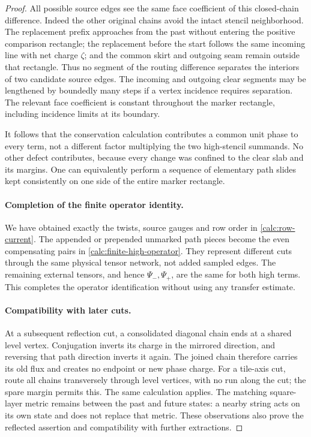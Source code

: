 \begin{proof}
All possible source edges see the same face coefficient of this
closed-chain difference.  Indeed the other original chains avoid
the intact stencil neighborhood.  The replacement prefix approaches
from the past without entering the positive comparison rectangle;
the replacement before the start follows the same incoming line
with net charge $\zeta$; and the common skirt and outgoing seam
remain outside that rectangle.  Thus no segment of the routing
difference separates the interiors of two candidate source edges.
The incoming and outgoing clear segments may be lengthened by
boundedly many steps if a vertex incidence requires separation.
The relevant face coefficient is constant throughout the marker
rectangle, including incidence limits at its boundary.

It follows that the conservation calculation contributes a common
unit phase to every term, not a different factor multiplying the
two high-stencil summands.  No other defect contributes, because
every change was confined to the clear slab and its margins.  One
can equivalently perform a sequence of elementary path slides kept
consistently on one side of the entire marker rectangle.

\paragraph{Completion of the finite operator identity.}
We have obtained exactly the twists, source gauges and row order in
\eqref{calc:row-current}.  The appended or prepended unmarked path
pieces become the even compensating pairs in
\eqref{calc:finite-high-operator}.  They represent different cuts
through the same physical tensor network, not added sampled edges.
The remaining external tensors, and hence $\Psi_-,\Psi_+$, are the
same for both high terms.  This completes the operator identification
without using any transfer estimate.

\paragraph{Compatibility with later cuts.}
At a subsequent reflection cut, a consolidated diagonal chain ends
at a shared level vertex.  Conjugation inverts its charge in the
mirrored direction, and reversing that path direction inverts it
again.  The joined chain therefore carries its old flux and creates
no endpoint or new phase charge.  For a tile-axis cut, route all
chains transversely through level vertices, with no run along the
cut; the spare margin permits this.  The same calculation applies.
The matching square-layer metric remains between the past and
future states: a nearby string acts on its own state and does not
replace that metric.  These observations also prove the reflected
assertion and compatibility with further extractions.
\end{proof}

